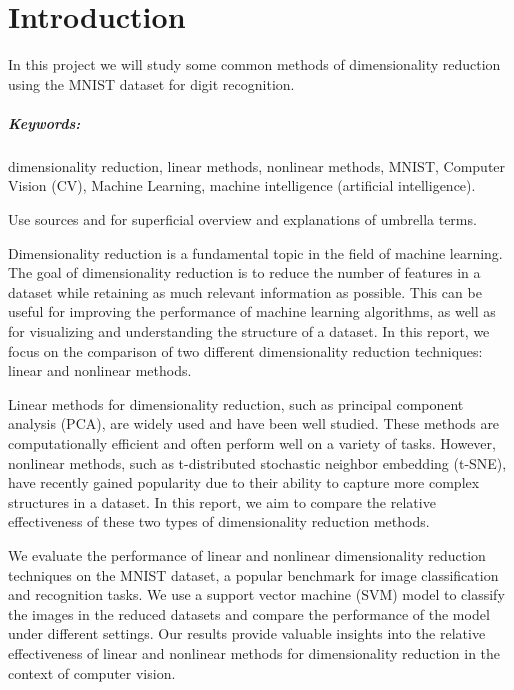 \chapter{Introduction}\label{cha:introduction}
\noindent
In this project we will study some common methods of dimensionality reduction using the MNIST dataset for digit recognition.

\paragraph{Keywords:} dimensionality reduction, linear methods, nonlinear methods, MNIST, Computer Vision (CV), Machine Learning, machine intelligence (artificial intelligence).

Use sources \cite{IBM-machine-intelligence} and \cite{IBM-computer-vision} for superficial overview and explanations of umbrella terms.


Dimensionality reduction is a fundamental topic in the field of machine learning. The goal of dimensionality reduction is to reduce the number of features in a dataset while retaining as much relevant information as possible. This can be useful for improving the performance of machine learning algorithms, as well as for visualizing and understanding the structure of a dataset. In this report, we focus on the comparison of two different dimensionality reduction techniques: linear and nonlinear methods.

Linear methods for dimensionality reduction, such as principal component analysis (PCA), are widely used and have been well studied. These methods are computationally efficient and often perform well on a variety of tasks. However, nonlinear methods, such as t-distributed stochastic neighbor embedding (t-SNE), have recently gained popularity due to their ability to capture more complex structures in a dataset. In this report, we aim to compare the relative effectiveness of these two types of dimensionality reduction methods.

We evaluate the performance of linear and nonlinear dimensionality reduction techniques on the MNIST dataset, a popular benchmark for image classification and recognition tasks. We use a support vector machine (SVM) model to classify the images in the reduced datasets and compare the performance of the model under different settings. Our results provide valuable insights into the relative effectiveness of linear and nonlinear methods for dimensionality reduction in the context of computer vision.

